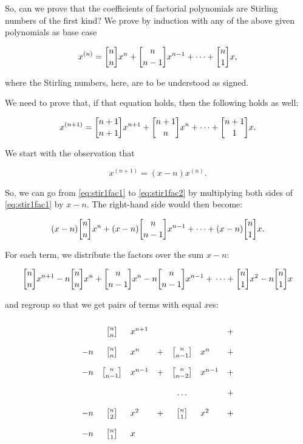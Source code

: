 \documentclass[tikz]{scrreprt}
\begin{document}
So, can we prove that the coefficients of factorial polynomials
are Stirling numbers of the first kind?
We prove by induction with any of the above given polynomials
as base case

\begin{equation}\label{eq:stir1fac1}
x^{(n)} = \stirlingOne{n}{n}x^n + 
          \stirlingOne{n}{n-1}x^{n-1} + \dots + 
          \stirlingOne{n}{1}x,
\end{equation}

where the Stirling numbers, here, are to be understood as signed.

We need to prove that, if that equation holds, 
then the following holds as well:

\begin{equation}\label{eq:stir1fac2}
x^{(n+1)} = \stirlingOne{n+1}{n+1}x^{n+1} + 
            \stirlingOne{n+1}{n}x^{n} + \dots + 
            \stirlingOne{n+1}{1}x.
\end{equation}

We start with the observation that

\begin{equation}
x^{(n+1)} = (x-n)x^{(n)}.
\end{equation}

So, we can go from \ref{eq:stir1fac1} to \ref{eq:stir1fac2}
by multiplying both sides of \ref{eq:stir1fac1} by $x-n$.
The right-hand side would then become:

\[
(x-n)\stirlingOne{n}{n}x^n + 
(x-n)\stirlingOne{n}{n-1}x^{n-1} +
      \dots + 
(x-n)\stirlingOne{n}{1}x.
\]

For each term, we distribute the factors over the sum $x-n$:

\[
\stirlingOne{n}{n}x^{n+1} - n\stirlingOne{n}{n}x^n        + \\
\stirlingOne{n}{n-1}x^n   - n\stirlingOne{n}{n-1}x^{n-1}  + \\
\dots                                                     + \\
\stirlingOne{n}{1}x^2     - n\stirlingOne{n}{1}x         
\]

and regroup so that we get pairs of terms 
with equal $x$es:

\[
\begingroup
\renewcommand{\arraystretch}{2}
\begin{array}{lclcclc}
  &\stirlingOne{n}{n}  &x^{n+1}& &                    &       & + \\
-n&\stirlingOne{n}{n}  &x^n    &+&\stirlingOne{n}{n-1}&x^n    & + \\
-n&\stirlingOne{n}{n-1}&x^{n-1}&+&\stirlingOne{n}{n-2}&x^{n-1}& + \\
  &                    &       & &\dots               &       & + \\
-n&\stirlingOne{n}{2}  &x^{2}  &+&\stirlingOne{n}{1}  &x^{2}  & + \\
-n&\stirlingOne{n}{1}  &x      & &                    &       & 
\end{array}
\endgroup
\]
\end{document}
